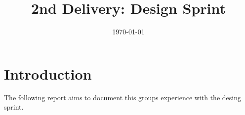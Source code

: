 \documentclass[12pt]{article}
\title{2nd Delivery: Design Sprint}
\date{\today}
\begin{document}
\subsectionfont{\fontsize{12}{14}\selectfont}

\maketitle

\tableofcontents

\section{Introduction}
The following report aims to document this groups experience with the desing sprint\cite{DesignSprint2024}.


\printbibliography
\end{document}
